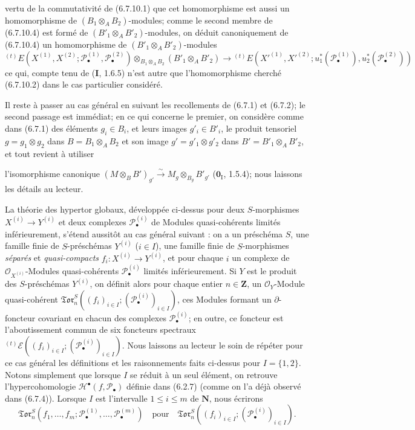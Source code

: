 \begin{env}[6.7.10]
vertu de la commutativité de (6.7.10.1) que cet homomorphisme est aussi un
homomorphisme de $(B_1\otimes_A B_2)$-modules; comme le second membre de
(6.7.10.4) est formé de $(B'_1\otimes_A B'_2)$-modules, on déduit
canoniquement de (6.7.10.4) un homomorphisme de
$(B'_1\otimes_A B'_2)$-modules
\[
  {}^{(t)}E
  (X^{(1)},X^{(2)};\mathscr P_\bullet^{(1)},\mathscr P_\bullet^{(2)})
  \otimes_{B_1\otimes_A B_2}(B'_1\otimes_A B'_2)
  \longrightarrow
  {}^{(t)}E
  (X'^{(1)},X'^{(2)};
   u_1^*(\mathscr P_\bullet^{(1)}),u_2^*(\mathscr P_\bullet^{(2)}))
  \tag{6.7.10.5}\label{III.6.7.10.5.fr}
\]
ce qui, compte tenu de (\textbf{I}, 1.6.5) n'est autre que l'homomorphisme cherché
(6.7.10.2) dans le cas particulier considéré.

Il reste à passer au cas général en suivant les recollements de (6.7.1) et
(6.7.2); le second passage est immédiat; en ce qui concerne le premier, on
considère comme dans (6.7.1) des éléments $g_i\in B_i$, et leurs images
$g'_i\in B'_i$, le produit tensoriel $g=g_1\otimes g_2$ dans
$B=B_1\otimes_A B_2$ et son image $g'=g'_1\otimes g'_2$ dans
$B'=B'_1\otimes_A B'_2$, et tout revient à utiliser

l'isomorphisme canonique
$(M\otimes_B B')_{g'}\xrightarrow{\sim}M_g\otimes_{B_g}B'_{g'}$
($\mathbf{0}_{\mathrm I}$, 1.5.4); nous laissons les détails au lecteur.
\end{env}

\begin{env}[6.7.11]
La théorie des hypertor globaux, développée ci-dessus pour deux
$S$-morphismes $X^{(i)}\to Y^{(i)}$ et deux complexes
$\mathscr P_\bullet^{(i)}$ de Modules quasi-cohérents limités inférieurement,
s'étend aussitôt au cas général suivant : on a un préschéma $S$, une famille
finie de $S$-préschémas $Y^{(i)}$ ($i\in I$), une famille finie de
$S$-morphismes \emph{séparés} et \emph{quasi-compacts}
$f_i:X^{(i)}\to Y^{(i)}$, et pour chaque $i$ un complexe de
$\mathscr O_{X^{(i)}}$-Modules quasi-cohérents
$\mathscr P_\bullet^{(i)}$ limités inférieurement. Si $Y$ est le produit des
$S$-préschémas $Y^{(i)}$, on définit alors pour chaque entier
$n\in\mathbf Z$, un $\mathscr O_Y$-Module quasi-cohérent
$\mathfrak{Tor}_n^S((f_i)_{i\in I};
(\mathscr P_\bullet^{(i)})_{i\in I})$,
ces Modules formant un $\partial$-foncteur covariant en chacun des complexes
$\mathscr P_\bullet^{(i)}$; en outre, ce foncteur est l'aboutissement commun
de six foncteurs spectraux
${}^{(t)}\mathscr E((f_i)_{i\in I};(\mathscr P_\bullet^{(i)})_{i\in I})$.
Nous laissons au lecteur le soin de répéter pour ce cas général les
définitions et les raisonnements faits ci-dessus pour $I=\{1,2\}$. Notons
simplement que lorsque $I$ se réduit à un seul élément, on retrouve
l'hypercohomologie $\mathscr H^\bullet(f,\mathscr P_\bullet)$ définie dans
(6.2.7) (comme on l'a déjà observé dans (6.7.4)). Lorsque $I$ est l'intervalle
$1\leq i\leq m$ de $\mathbf N$, nous écrirons
\[
  \mathfrak{Tor}_n^S
  (f_1,\ldots,f_m;
   \mathscr P_\bullet^{(1)},\ldots,\mathscr P_\bullet^{(m)})
  \quad\text{pour}\quad
  \mathfrak{Tor}_n^S
  ((f_i)_{i\in I};(\mathscr P_\bullet^{(i)})_{i\in I}).
\]
\end{env}

